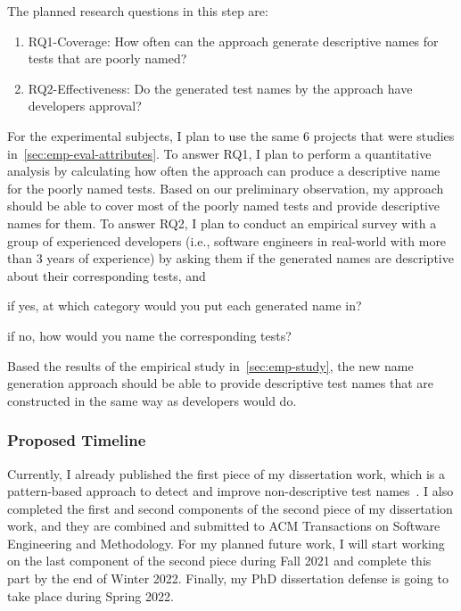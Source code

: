 The planned research questions in this step are:
%
\begin{enumerate}
    \item RQ1-Coverage: How often can the approach generate descriptive names for tests that are poorly named?
    \item RQ2-Effectiveness: Do the generated test names by the approach have developers approval?
\end{enumerate}
%
For the experimental subjects, I plan to use the same \num{6} projects that were studies in~\cref{sec:emp-eval-attributes}.
%
To answer RQ1, I plan to perform a quantitative analysis by calculating how often the approach can produce a descriptive name for the poorly named tests.
%
Based on our preliminary observation, my approach should be able to cover most of the poorly named tests and provide descriptive names for them.
%
To answer RQ2, I plan to conduct an empirical survey with a group of experienced developers (i.e., software engineers in real-world with more than \num{3} years of experience) by asking them if the generated names are descriptive about their corresponding tests, and
\begin{enumerate*}
    \item if yes, at which category would you put each generated name in?
    \item if no, how would you name the corresponding tests?
\end{enumerate*}
%
Based the results of the empirical study in~\cref{sec:emp-study}, the new name generation approach should be able to provide descriptive test names that are constructed in the same way as developers would do.


\subsubsection{Proposed Timeline}

Currently, I already published the first piece of my dissertation work, which is a pattern-based approach to detect and improve non-descriptive test names~\cite{wu2020pattern}.
%
I also completed the first and second components of the second piece of my dissertation work, and they are combined and submitted to ACM Transactions on Software Engineering and Methodology.
%
For my planned future work, I will start working on the last component of the second piece during Fall 2021 and complete this part by the end of Winter 2022.
%
Finally, my PhD dissertation defense is going to take place during Spring 2022.